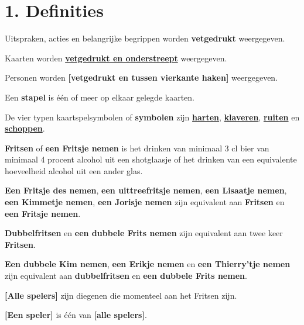 \newpage
\drawBar{}

\section*{1. Definities}

\item \label{itm:1A} Uitspraken, acties en belangrijke begrippen worden \textbf{vetgedrukt} weergegeven.

\item Kaarten worden \ul{\textbf{vetgedrukt en onderstreept}} weergegeven.

\item Personen worden \textbf{[vetgedrukt en tussen vierkante haken]} weergegeven.

\item Een \textbf{stapel} is één of meer op elkaar gelegde kaarten.

\item De vier typen kaartspelsymbolen of \textbf{symbolen} zijn \ul{\textbf{harten}}, \ul{\textbf{klaveren}}, \ul{\textbf{ruiten}} en \ul{\textbf{schoppen}}. 

\item \label{def:fritsen} \textbf{Fritsen} of \textbf{een Fritsje nemen} is het drinken van minimaal 3 cl bier van minimaal 4 procent alcohol uit een shotglaasje of het drinken van een equivalente hoeveelheid alcohol uit een ander glas.

\item \label{item:enkel_fritsen_equivalent}\textbf{Een Fritsje des nemen}, \textbf{een uittreefritsje nemen}, \textbf{een Lisaatje nemen}, \textbf{een Kimmetje nemen}, \textbf{een Jorisje nemen} zijn equivalent aan \textbf{Fritsen} en \textbf{een Fritsje nemen}. 

\item \label{item:dubbelfritsen_equivalent} \textbf{Dubbelfritsen} en \textbf{een dubbele Frits nemen} zijn equivalent aan twee keer \textbf{Fritsen}.

\item \textbf{Een dubbele Kim nemen}, \textbf{een Erikje nemen} en \textbf{een Thierry'tje nemen} zijn equivalent aan \textbf{dubbelfritsen} en \textbf{een dubbele Frits nemen}.

\item \textbf{[Alle spelers]} zijn diegenen die momenteel aan het Fritsen zijn.

\item \textbf{[Een speler]} is één van \textbf{[alle spelers]}. 

